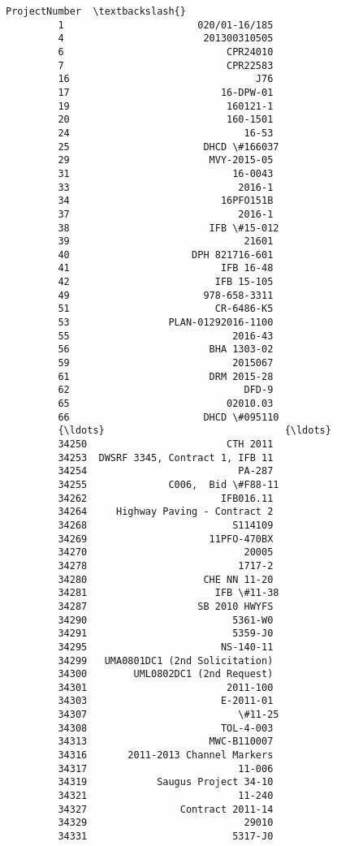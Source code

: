 \documentclass[11pt]{article}
\begin{document}
\begin{Verbatim}[commandchars=\\\{\}]
                                 ProjectNumber  \textbackslash{}
         1                       020/01-16/185   
         4                        201300310505   
         6                            CPR24010   
         7                            CPR22583   
         16                                J76   
         17                          16-DPW-01   
         19                           160121-1   
         20                           160-1501   
         24                              16-53   
         25                       DHCD \#166037   
         29                        MVY-2015-05   
         31                            16-0043   
         33                             2016-1   
         34                          16PFO151B   
         37                             2016-1   
         38                        IFB \#15-012   
         39                              21601   
         40                     DPH 821716-601   
         41                          IFB 16-48   
         42                         IFB 15-105   
         49                       978-658-3311   
         51                         CR-6486-K5   
         53                 PLAN-01292016-1100   
         55                            2016-43   
         56                        BHA 1303-02   
         59                            2015067   
         61                        DRM 2015-28   
         62                              DFD-9   
         65                           02010.03   
         66                       DHCD \#095110   
         {\ldots}                               {\ldots}   
         34250                        CTH 2011   
         34253  DWSRF 3345, Contract 1, IFB 11   
         34254                          PA-287   
         34255              C006,  Bid \#F88-11   
         34262                       IFB016.11   
         34264     Highway Paving - Contract 2   
         34268                         S114109   
         34269                     11PFO-470BX   
         34270                           20005   
         34278                          1717-2   
         34280                    CHE NN 11-20   
         34281                      IFB \#11-38   
         34287                   SB 2010 HWYFS   
         34290                         5361-W0   
         34291                         5359-J0   
         34295                       NS-140-11   
         34299   UMA0801DC1 (2nd Solicitation)   
         34300        UML0802DC1 (2nd Request)   
         34301                        2011-100   
         34303                       E-2011-01   
         34307                          \#11-25   
         34308                       TOL-4-003   
         34313                     MWC-B110007   
         34316       2011-2013 Channel Markers   
         34317                          11-006   
         34319            Saugus Project 34-10   
         34321                          11-240   
         34327                Contract 2011-14   
         34329                           29010   
         34331                         5317-J0   
         

\end{Verbatim}
\end{document}
